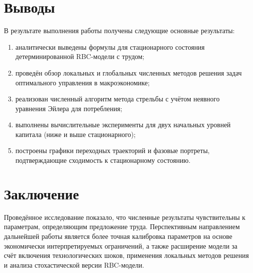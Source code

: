 \documentclass[12pt,a4paper]{report}   %
\begin{document}

    \chapter*{Выводы}
        В результате выполнения работы получены следующие основные результаты:
        \begin{enumerate}[label=\arabic*)]
            \item аналитически выведены формулы для стационарного состояния детерминированной RBC-модели с трудом;
            \item проведён обзор локальных и глобальных численных методов решения задач оптимального управления в макроэкономике;
            \item реализован численный алгоритм метода стрельбы с учётом неявного уравнения Эйлера для потребления;
            \item выполнены вычислительные эксперименты для двух начальных уровней капитала (ниже и выше стационарного);
            \item построены графики переходных траекторий и фазовые портреты, подтверждающие сходимость к стационарному состоянию.
        \end{enumerate}


    \chapter*{Заключение}
        Проведённое исследование показало, что численные результаты чувствительны к параметрам, определяющим предложение труда. Перспективным направлением дальнейшей работы является более точная калибровка параметров на основе экономически интерпретируемых ограничений, а также расширение модели за счёт включения технологических шоков, применения локальных методов решения и анализа стохастической версии RBC-модели.

    \clearpage
\end{document}
